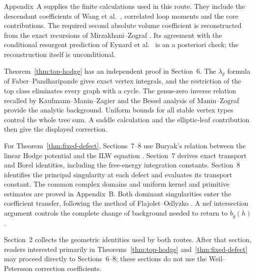 Appendix~A supplies the finite calculations used in this route.
They include the descendant coefficients of Wang et al.\
\cite[Lemma 7.2 and Appendix C.1]{W26}, correlated loop moments
and the core contributions. The required second absolute volume
coefficient is reconstructed from the exact recursions of
Mirzakhani--Zograf \cite[\S 2]{MZ15}. Its agreement with the
conditional resurgent prediction of Eynard et al.\
\cite[\S 6.1, (6.10)]{EGGLS24} is an a posteriori check;
the reconstruction itself is unconditional.

Theorem~\ref{thm:top-hodge} has an independent proof in Section~6.
The $\lambda_g$ formula of Faber--Pandharipande
\cite[Theorem 1]{FP03} gives exact vertex integrals, and the
restriction of the top class eliminates every graph with a cycle.
The genus-zero inverse relation recalled by Kaufmann--Manin--Zagier
\cite[(0.8)]{KMZ96v1} and the Bessel analysis of Manin--Zograf
\cite[\S 6, (17) and Proof 6.3]{MaZ00} provide the analytic
background. Uniform bounds for all stable vertex types control
the whole tree sum. A saddle calculation and the elliptic-leaf
contribution then give the displayed correction.

For Theorem~\ref{thm:fixed-defect}, Sections~7--8 use Buryak's relation
between the linear Hodge potential and the ILW equation
\cite[Theorem 1.1]{Bur15}. Section~7 derives exact transport and
Borel identities, including the free-energy integration constants.
Section~8 identifies the principal singularity at each defect and
evaluates its transport constant. The common complex domains and
uniform kernel and primitive estimates are proved in Appendix~B.
Both dominant singularities enter the coefficient transfer,
following the method of Flajolet--Odlyzko \cite[\S 2]{FO90}.
A nef intersection argument controls the complete change of
background needed to return to $b_g(h)$.

Section~2 collects the geometric identities used by both routes.
After that section, readers interested primarily in
Theorems~\ref{thm:top-hodge} and~\ref{thm:fixed-defect}
may proceed directly to Sections~6--8; these sections do not use
the Weil--Petersson correction coefficients.
